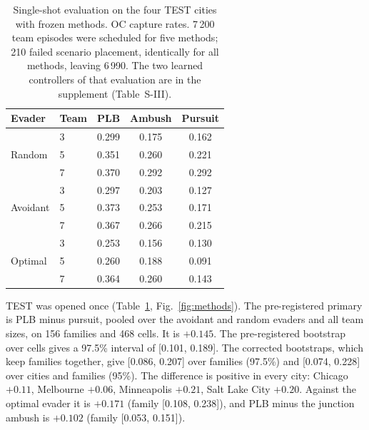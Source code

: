\documentclass[5p,twocolumn]{elsarticle}
\begin{document}
\begin{table}[!t]
\centering
\caption{Single-shot evaluation on the four TEST cities with frozen methods. OC capture rates. 7\,200 team episodes
were scheduled for five methods; 210 failed scenario placement, identically for all methods, leaving 6\,990. The two
learned controllers of that evaluation are in the supplement (Table~S-III).}
\label{tab:test}
\small
\setlength{\tabcolsep}{5pt}
\begin{tabular}{@{}llccc@{}}
\toprule
Evader & Team & PLB & Ambush & Pursuit \\
\midrule
\multirow{3}{*}{Random} & 3 & 0.299 & 0.175 & 0.162 \\
& 5 & 0.351 & 0.260 & 0.221 \\
& 7 & 0.370 & 0.292 & 0.292 \\
\midrule
\multirow{3}{*}{Avoidant} & 3 & 0.297 & 0.203 & 0.127 \\
& 5 & 0.373 & 0.253 & 0.171 \\
& 7 & 0.367 & 0.266 & 0.215 \\
\midrule
\multirow{3}{*}{Optimal} & 3 & 0.253 & 0.156 & 0.130 \\
& 5 & 0.260 & 0.188 & 0.091 \\
& 7 & 0.364 & 0.260 & 0.143 \\
\bottomrule
\end{tabular}
\end{table}

TEST was opened once (Table~\ref{tab:test}, Fig.~\ref{fig:methods}). The pre-registered primary is PLB minus pursuit,
pooled over the avoidant and random evaders and all team sizes, on 156 families and 468 cells. It is $+0.145$. The
pre-registered bootstrap over cells gives a 97.5\% interval of [0.101, 0.189]. The corrected bootstraps, which keep
families together, give [0.086, 0.207] over families (97.5\%) and [0.074, 0.228] over cities and families (95\%). The
difference is positive in every city: Chicago $+0.11$, Melbourne $+0.06$, Minneapolis $+0.21$, Salt Lake City
$+0.20$. Against the optimal evader it is $+0.171$ (family [0.108, 0.238]), and PLB minus the junction ambush is
$+0.102$ (family [0.053, 0.151]).
\end{document}
